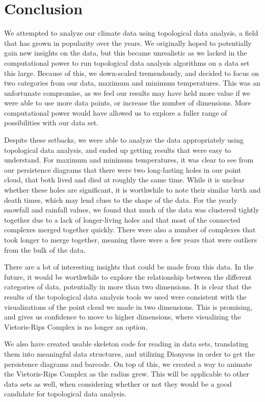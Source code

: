 \documentclass[12pt]{report}
\begin{document}
\section*{Conclusion}
We attempted to analyze our climate data using topological data analysis, a field that has grown in popularity over the years. We originally hoped to potentially gain new insights on the data, but this became unrealistic as we lacked in the computational power to run topological data analysis algorithms on a data set this large. Because of this, we down-scaled tremendously, and decided to focus on two categories from our data, maximum and minimum temperatures. This was an unfortunate compromise, as we feel our results may have held more value if we were able to use more data points, or increase the number of dimensions. More computational power would have allowed us to explore a fuller range of possibilities with our data set.\par
Despite these setbacks, we were able to analyze the data appropriately using topological data analysis, and ended up getting results that were easy to understand. For maximum and minimum temperatures, it was clear to see from our persistence diagrams that there were two long-lasting holes in our point cloud, that both lived and died at roughly the same time. While it is unclear whether these holes are significant, it is worthwhile to note their similar birth and death times, which may lend clues to the shape of the data. For the yearly snowfall and rainfall values, we found that much of the data was clustered tightly together due to a lack of longer-living holes and that most of the connected complexes merged together quickly. There were also a number of complexes that took longer to merge together, meaning there were a few years that were outliers from the bulk of the data.\par
There are a lot of interesting insights that could be made from this data. In the future, it would be worthwhile to explore the relationship between the different categories of data, potentially in more than two dimensions. It is clear that the results of the topological data analysis tools we used were consistent with the visualizations of the point cloud we made in two dimensions. This is promising, and gives us confidence to move to higher dimensions, where visualizing the Vietoris-Rips Complex is no longer an option.\par
We also have created usable skeleton code for reading in data sets, translating them into meaningful data structures, and utilizing Dionysus in order to get the persistence diagrams and barcode. On top of this, we created a way to animate the Vietoris-Rips Complex as the radius grew. This will be applicable to other data sets as well, when considering whether or not they would be a good candidate for topological data analysis.\par
\end{document}

